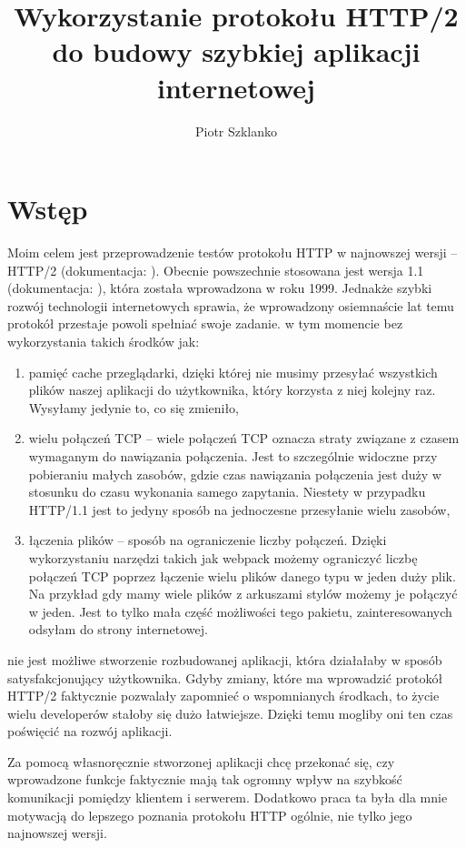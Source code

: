 \documentclass[a4paper,12pt,twoside,openany]{report}
\title{Wykorzystanie protokołu HTTP/2 do budowy szybkiej aplikacji internetowej}
\author{Piotr Szklanko}
\begin{document}
\maketitle

\chapter{Wstęp}
Moim celem jest przeprowadzenie testów protokołu HTTP w najnowszej wersji -- HTTP/2 (dokumentacja: \cite{RFC7540}).
Obecnie powszechnie stosowana jest wersja 1.1 (dokumentacja: \cite{RFC2616}), która została wprowadzona w roku 1999.
Jednakże szybki rozwój technologii internetowych sprawia, że wprowadzony osiemnaście lat temu protokół przestaje powoli spełniać swoje zadanie.
w tym momencie bez wykorzystania takich środków jak:
\begin{enumerate}
	\item pamięć cache przeglądarki, dzięki której nie musimy przesyłać wszystkich plików naszej aplikacji do użytkownika, który korzysta z niej kolejny raz. 
	Wysyłamy jedynie to, co się zmieniło,
	\item wielu połączeń TCP -- wiele połączeń TCP oznacza straty związane z czasem wymaganym do nawiązania połączenia\cite{connectionMng}.
	Jest to szczególnie widoczne przy pobieraniu małych zasobów, gdzie czas nawiązania połączenia jest duży w stosunku do czasu wykonania samego zapytania.
	Niestety w przypadku HTTP/1.1 jest to jedyny sposób na jednoczesne przesyłanie wielu zasobów,
	\item łączenia plików -- sposób na ograniczenie liczby połączeń.
	Dzięki wykorzystaniu narzędzi takich jak webpack możemy ograniczyć liczbę połączeń TCP poprzez łączenie wielu plików danego typu w jeden duży plik.
	Na przykład gdy mamy wiele plików z arkuszami stylów możemy je połączyć w jeden.
	Jest to tylko mała część możliwości tego pakietu, zainteresowanych odsyłam do strony internetowej\cite{webpack}.
\end{enumerate}
nie jest możliwe stworzenie rozbudowanej aplikacji, która działałaby w sposób satysfakcjonujący użytkownika.
Gdyby zmiany, które ma wprowadzić protokół HTTP/2 faktycznie pozwalały zapomnieć o wspomnianych środkach, to życie wielu developerów stałoby się dużo łatwiejsze.
Dzięki temu mogliby oni ten czas poświęcić na rozwój aplikacji.

Za pomocą własnoręcznie stworzonej aplikacji chcę przekonać się, czy wprowadzone funkcje faktycznie mają tak ogromny wpływ na szybkość komunikacji pomiędzy klientem i serwerem. Dodatkowo praca ta była dla mnie motywacją do lepszego poznania protokołu HTTP ogólnie, nie tylko jego najnowszej wersji.
\end{document}
